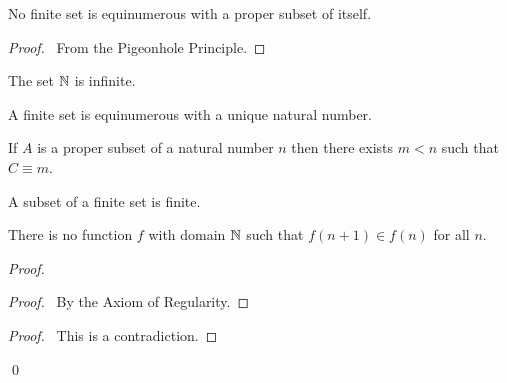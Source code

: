 \begin{theorem}
    No finite set is equinumerous with a proper subset of itself.
\end{theorem}

\begin{proof}
    \pf\ From the Pigeonhole Principle.
\end{proof}

\begin{corollary}
    The set $\mathbb{N}$ is infinite.
\end{corollary}

\begin{corollary}
    A finite set is equinumerous with a unique natural number.
\end{corollary}

\begin{lemma}
    If $A$ is a proper subset of a natural number $n$ then there exists
    $m < n$ such that $C \equiv m$.
\end{lemma}

\begin{corollary}
    A subset of a finite set is finite.
\end{corollary}

\begin{theorem}[Regularity]
    There is no function $f$ with domain $\mathbb{N}$ such that $f(n+1) \in f(n)$ for all $n$.
\end{theorem}

\begin{proof}
    \pf
    \begin{proof}
        \pf\ By the Axiom of Regularity.
    \end{proof}
    \qedstep
    \begin{proof}
        \pf\ This is a contradiction.
    \end{proof}
    \qed
\end{proof}